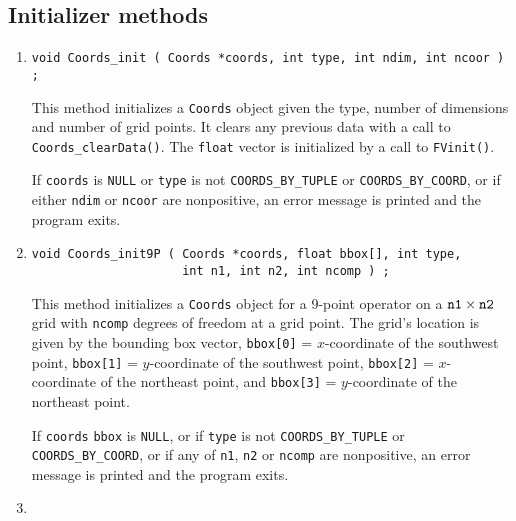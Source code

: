 \subsection{Initializer methods}
\label{subsection:Coords:proto:initializers}
\par
\begin{enumerate}
\item
\begin{verbatim}
void Coords_init ( Coords *coords, int type, int ndim, int ncoor ) ;
\end{verbatim}
This method initializes a {\tt Coords} object given 
the type, number of dimensions and number of grid points.
It clears any previous data with a call to 
{\tt Coords\_clearData()}. 
The {\tt float} vector is initialized by a call to {\tt FVinit()}.
\par {}
If {\tt coords} is {\tt NULL} or {\tt type} is not 
{\tt COORDS\_BY\_TUPLE} or {\tt COORDS\_BY\_COORD},
or if either {\tt ndim} or {\tt ncoor} are nonpositive,
an error message is printed and the program exits.
\item
\begin{verbatim}
void Coords_init9P ( Coords *coords, float bbox[], int type, 
                     int n1, int n2, int ncomp ) ;
\end{verbatim}
This method initializes a {\tt Coords} object for a 9-point
operator on a $\mbox{\tt n1} \times \mbox{\tt n2}$ grid with
{\tt ncomp} degrees of freedom at a grid point.
The grid's location is given by the bounding box vector,
{\tt bbox[0]} = $x$-coordinate of the southwest point,
{\tt bbox[1]} = $y$-coordinate of the southwest point,
{\tt bbox[2]} = $x$-coordinate of the northeast point, and
{\tt bbox[3]} = $y$-coordinate of the northeast point.
\par {}
If {\tt coords} {\tt bbox} is {\tt NULL},
or if {\tt type} is not 
{\tt COORDS\_BY\_TUPLE} or {\tt COORDS\_BY\_COORD},
or if any of {\tt n1}, {\tt n2} or {\tt ncomp} are nonpositive,
an error message is printed and the program exits.
\item
\begin{verbatim}

\end{verbatim}
\end{enumerate}
